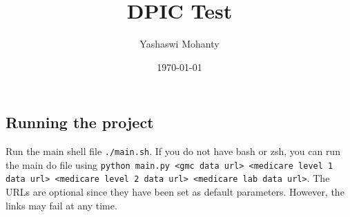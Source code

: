 \documentclass{article}
\title{DPIC Test}
\author{Yashaswi Mohanty}
\date{\today}
\begin{document}
\maketitle

\subsection*{Running the project}
Run the main shell file \verb|./main.sh|. If you do not have bash or zsh, you can run the main do file using \verb|python main.py <gmc data url> <medicare level 1 data url> <medicare level 2 data url> <medicare lab data url>|. The URLs are optional since they have been set as default parameters. However, the links may fail at any time. 
\end{document}
